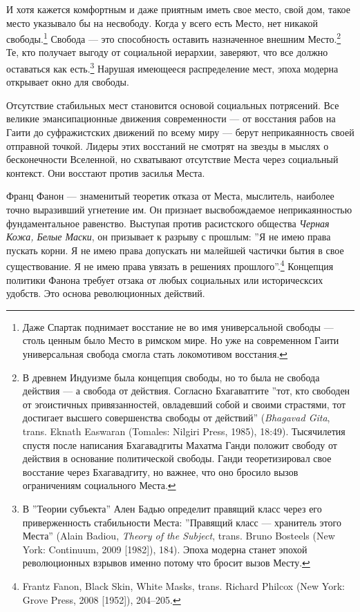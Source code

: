 \documentclass[12pt]{book}
\begin{document}
И хотя кажется комфортным и даже приятным иметь свое место, свой дом, такое место указывало бы на несвободу. Когда у всего есть Место, нет никакой свободы.\footnote{Даже Спартак поднимает восстание не во имя универсальной свободы --- столь ценным было Место в римском мире. Но уже на современном Гаити универсальная свобода смогла стать локомотивом восстания.} Свобода --- это способность оставить назначенное внешним Место.\footnote{В древнем Индуизме была концепция свободы, но то была не свобода действия --- а свобода от действия. Согласно Бхагаватгите ''тот, кто свободен от эгоистичных привязанностей, овладевший собой и своими страстями, тот достигает высшего совершенства свободы от действий'' (\textit{Bhagavad Gita}, trans. Eknath Easwaran (Tomales: Nilgiri Press, 1985), 18:49). Тысячилетия спустя после написания Бхагавадгиты Махатма Ганди положит свободу от действия в основание политической свободы. Ганди теоретизировал свое восстание через Бхагавадгиту, но важнее, что оно бросило вызов ограничениям социального Места.} Те, кто получает выгоду от социальной иерархии, заверяют, что все должно оставаться как есть.\footnote{В ''Теории субъекта'' Ален Бадью определит правящий класс через его приверженность стабильности Места: ''Правящий класс --- хранитель этого Места'' (Alain Badiou, \textit{Theory of the Subject}, trans. Bruno Bosteels (New York: Continuum, 2009 [1982]), 184). Эпоха модерна станет эпохой революционных взрывов именно потому что бросит вызов Месту.} Нарушая имеющееся распределение мест, эпоха модерна открывает окно для свободы.

Отсутствие стабильных мест становится основой социальных потрясений. Все великие эмансипационные движения современности --- от восстания рабов на Гаити до суфражистских движений по всему миру --- берут неприкаянность своей отправной точкой. Лидеры этих восстаний не смотрят на звезды в мыслях о бесконечности Вселенной, но схватывают отсутствие Места через социальный контекст. Они восстают против засилья Места.

Франц Фанон --- знаменитый теоретик отказа от Места, мыслитель, наиболее точно выразивший угнетение им. Он признает высвобождаемое неприкаянностью фундаментальное равенство. Выступая против расистского общества \textit{Черная Кожа, Белые Маски}, он призывает к разрыву с прошлым: ''Я не имею права пускать корни. Я не имею права допускать ни малейшей частички бытия в свое существование. Я не имею права увязать в решениях прошлого''.\footnote{Frantz Fanon, Black Skin, White Masks, trans. Richard Philcox (New York: Grove Press, 2008 [1952]), 204–205.} Концепция политики Фанона требует отзака от любых социальных или историческсих удобств. Это основа революционных действий.
\end{document}
